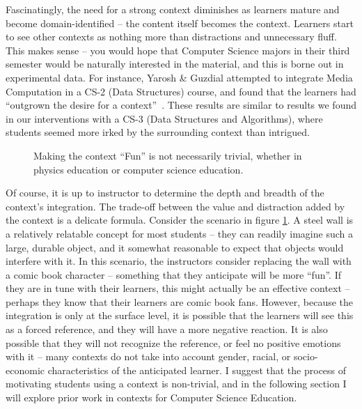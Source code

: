 Fascinatingly, the need for a strong context diminishes as learners mature and become domain-identified -- the content itself becomes the context.
Learners start to see other contexts as nothing more than distractions and unnecessary fluff.
This makes sense -- you would hope that Computer Science majors in their third semester would be naturally interested in the material, and this is borne out in experimental data.
For instance, Yarosh \& Guzdial attempted to integrate Media Computation in a CS-2 (Data Structures) course, and found that the learners had ``outgrown the desire for a context''~\cite{yarosh2008narrating}. 
These results are similar to results we found in our interventions with a CS-3 (Data Structures and Algorithms), where students seemed more irked by the surrounding context than intrigued.


\begin{figure}[!ht]
	\begin{center}
	\end{center}
	\caption{Making the context ``Fun'' is not necessarily trivial, whether in physics education or computer science education.~\cite{SMBC}}
	\label{fig-comic-context}
\end{figure}

Of course, it is up to instructor to determine the depth and breadth of the context's integration.
The trade-off between the value and distraction added by the context is a delicate formula.
Consider the scenario in figure \ref{fig-comic-context}.
A steel wall is a relatively relatable concept for most students -- they can readily imagine such a large, durable object, and it somewhat reasonable to expect that objects would interfere with it.
In this scenario, the instructors consider replacing the wall with a comic book character -- something that they anticipate will be more ``fun''.
If they are in tune with their learners, this might actually be an effective context -- perhaps they know that their learners are comic book fans.
However, because the integration is only at the surface level, it is possible that the learners will see this as a forced reference, and they will have a more negative reaction.
It is also possible that they will not recognize the reference, or feel no positive emotions with it -- many contexts do not take into account gender, racial, or socio-economic characteristics of the anticipated learner.
I suggest that the process of motivating students using a context is non-trivial, and in the following section I will explore prior work in contexts for Computer Science Education.